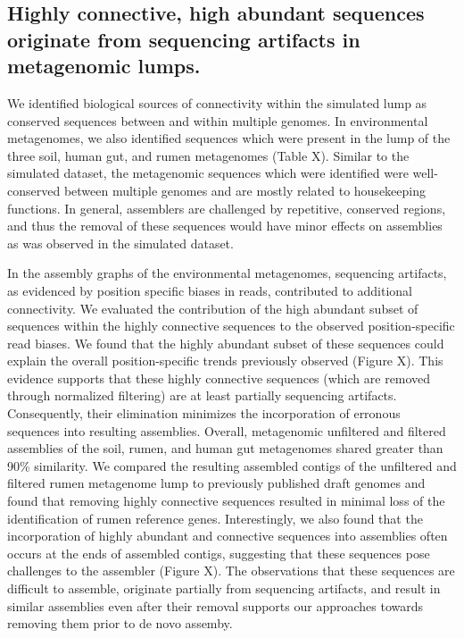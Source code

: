 \documentclass[11pt]{article} %
\begin{document}
\subsection{Highly connective, high abundant sequences originate from sequencing artifacts in metagenomic lumps.}

We identified biological sources of connectivity within the simulated lump as conserved sequences between and within multiple genomes.  In environmental metagenomes, we also identified sequences which were present in the lump of the three soil, human gut, and rumen metagenomes (Table X).  Similar to the simulated dataset, the metagenomic sequences which were identified were well-conserved between multiple genomes and are mostly related to housekeeping functions.  In general, assemblers are challenged by repetitive, conserved regions, and thus the removal of these sequences would have minor effects on assemblies as was observed in the simulated dataset.   

In the assembly graphs of the environmental metagenomes, sequencing artifacts, as evidenced by position specific biases in reads, contributed to additional connectivity. We evaluated the contribution of the high abundant subset of sequences within the highly connective sequences to the observed position-specific read biases.  We found that the highly abundant subset of these sequences could explain the overall position-specific trends previously observed (Figure X).  This evidence supports that these highly connective sequences (which are removed through normalized filtering) are at least partially sequencing artifacts.  Consequently, their elimination minimizes the incorporation of erronous sequences into resulting assemblies.  Overall, metagenomic unfiltered and filtered assemblies of the soil, rumen, and human gut metagenomes shared greater than 90\% similarity.  We compared the resulting assembled contigs of the unfiltered and filtered rumen metagenome lump to previously published draft genomes and found that removing highly connective sequences resulted in minimal loss of the identification of rumen reference genes.  Interestingly, we also found that the incorporation of highly abundant and connective sequences into assemblies often occurs at the ends of assembled contigs, suggesting that these sequences pose challenges to the assembler (Figure X).  The observations that these sequences are difficult to assemble, originate partially from sequencing artifacts, and result in similar assemblies even after their removal supports our approaches towards removing them prior to de novo assemby.  
\end{document}
